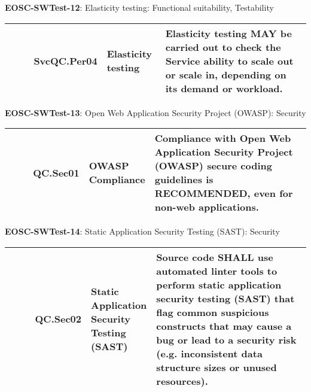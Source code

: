 \textbf{EOSC-SWTest-12}: Elasticity testing: Functional suitability, Testability
\nopagebreak[4]
\begin{center}
    \tabletail{\hline}
    \tiny
    \begin{supertabular}{|p{0.10\linewidth}|p{0.10\linewidth}|p{0.20\linewidth}|p{0.60\linewidth}|} \hline
        \cite{orviz_fernandez_eosc-synergy_2020} & SvcQC.Per04 & Elasticity testing & Elasticity testing MAY be carried out to check the Service ability to scale out or scale in, depending on its demand or workload.\\ \hline
    \end{supertabular}
\end{center}

\textbf{EOSC-SWTest-13}: Open Web Application Security Project (OWASP): Security
\nopagebreak[4]
\begin{center}
    \tabletail{\hline}
    \tiny
    \begin{supertabular}{|p{0.10\linewidth}|p{0.10\linewidth}|p{0.20\linewidth}|p{0.60\linewidth}|} \hline
        \cite{orviz_set_2017} & QC.Sec01 & OWASP Compliance & Compliance with Open Web Application Security Project (OWASP) secure coding guidelines is RECOMMENDED, even for non-web applications.\\ \hline
    \end{supertabular}
\end{center}

\textbf{EOSC-SWTest-14}: Static Application Security Testing (SAST): Security
\nopagebreak[4]
\begin{center}
    \tabletail{\hline}
    \tiny
    \begin{supertabular}{|p{0.10\linewidth}|p{0.10\linewidth}|p{0.20\linewidth}|p{0.60\linewidth}|} \hline
        \cite{orviz_set_2017} & QC.Sec02 & Static Application Security Testing (SAST) & Source code SHALL use automated linter tools to perform static application security testing (SAST) that flag common suspicious constructs that may cause a bug or lead to a security risk (e.g. inconsistent data structure sizes or unused resources).\\ \hline
    \end{supertabular}
\end{center}

